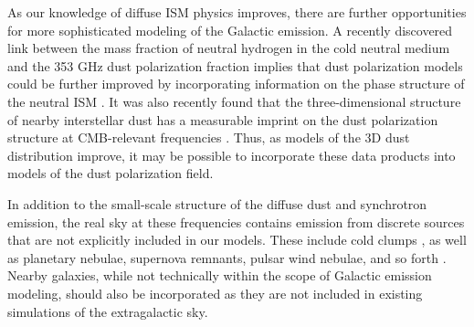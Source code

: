 \documentclass[twocolumn]{aastex631}
\begin{document}
As our knowledge of diffuse ISM physics improves, there are further opportunities for more sophisticated modeling of the Galactic emission. A recently discovered link between the mass fraction of neutral hydrogen in the cold neutral medium and the 353 GHz dust polarization fraction implies that dust polarization models could be further improved by incorporating information on the phase structure of the neutral ISM \citep{Lei:2024}. It was also recently found that the three-dimensional structure of nearby interstellar dust has a measurable imprint on the dust polarization structure at CMB-relevant frequencies \citep{Halal:2024a}. Thus, as models of the 3D dust distribution \citep[e.g.,][]{Edenhofer:2024, Zhang:2024} improve, it may be possible to incorporate these data products into models of the dust polarization field.

In addition to the small-scale structure of the diffuse dust and synchrotron emission, the real sky at these frequencies contains emission from discrete sources that are not explicitly included in our models. These include cold clumps \citep{Clancy:2023}, as well as planetary nebulae, supernova remnants, pulsar wind nebulae, and so forth \citep{Naess:2020, Guan:2021}. Nearby galaxies, while not technically within the scope of Galactic emission modeling, should also be incorporated as they are not included in existing simulations of the extragalactic sky.



\end{document}
